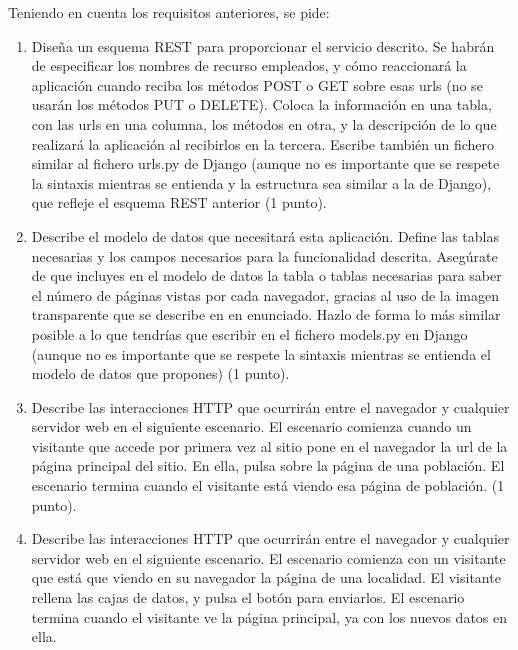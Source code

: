 Teniendo en cuenta los requisitos anteriores, se pide:

\begin{enumerate}
\item Diseña un esquema REST para proporcionar el servicio descrito. Se habrán de especificar los nombres de recurso empleados, y cómo reaccionará la aplicación cuando reciba los métodos POST o GET sobre esas urls (no se usarán los métodos PUT o DELETE). Coloca la información en una tabla, con las urls en una columna, los métodos en otra, y la descripción de lo que realizará la aplicación al recibirlos en la tercera. Escribe también un fichero similar al fichero urls.py de Django (aunque no es importante que se respete la sintaxis mientras se entienda y la estructura sea similar a la de Django), que refleje el esquema REST anterior (1 punto).

\item Describe el modelo de datos que necesitará esta aplicación. Define las tablas necesarias y los campos necesarios para la funcionalidad descrita. Asegúrate de que incluyes en el modelo de datos la tabla o tablas necesarias para saber el número de páginas vistas por cada navegador, gracias al uso de la imagen transparente que se describe en en enunciado. Hazlo de forma lo más similar posible a lo que tendrías que escribir en el fichero models.py en Django (aunque no es importante que se respete la sintaxis mientras se entienda el modelo de datos que propones) (1 punto).

\item Describe las interacciones HTTP que ocurrirán entre el navegador y cualquier servidor web en el siguiente escenario. El escenario comienza cuando un visitante que accede por primera vez al sitio pone en el navegador la url de la página principal del sitio. En ella, pulsa sobre la página de una población. El escenario termina cuando el visitante está viendo esa página de población. (1 punto).

\item Describe las interacciones HTTP que ocurrirán entre el navegador y cualquier servidor web en el siguiente escenario. El escenario comienza con un visitante que está que viendo en su navegador la página de una localidad. El visitante rellena las cajas de datos, y pulsa el botón para enviarlos. El escenario termina cuando el visitante ve la página principal, ya con los nuevos datos en ella.


\end{enumerate}
